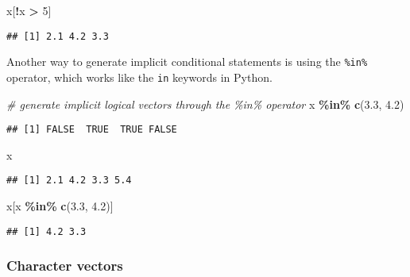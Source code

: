 \documentclass[
]{book}
\newenvironment{Shaded}{\begin{snugshade}}{\end{snugshade}}
\newcommand{\CommentTok}[1]{\textcolor[rgb]{0.56,0.35,0.01}{\textit{#1}}}
\newcommand{\DecValTok}[1]{\textcolor[rgb]{0.00,0.00,0.81}{#1}}
\newcommand{\FloatTok}[1]{\textcolor[rgb]{0.00,0.00,0.81}{#1}}
\newcommand{\KeywordTok}[1]{\textcolor[rgb]{0.13,0.29,0.53}{\textbf{#1}}}
\newcommand{\NormalTok}[1]{#1}
\newcommand{\OperatorTok}[1]{\textcolor[rgb]{0.81,0.36,0.00}{\textbf{#1}}}
\newcommand{\StringTok}[1]{\textcolor[rgb]{0.31,0.60,0.02}{#1}}
\begin{document}
\begin{Shaded}
\begin{Highlighting}[]
\NormalTok{x[}\OperatorTok{!}\NormalTok{x }\OperatorTok{\textgreater{}}\StringTok{ }\DecValTok{5}\NormalTok{]}
\end{Highlighting}
\end{Shaded}

\begin{verbatim}
## [1] 2.1 4.2 3.3
\end{verbatim}

Another way to generate implicit conditional statements is using the \texttt{\%in\%} operator, which works like the \texttt{in} keywords in Python.

\begin{Shaded}
\begin{Highlighting}[]
\CommentTok{\# generate implicit logical vectors through the \%in\% operator}
\NormalTok{x }\OperatorTok{\%in\%}\StringTok{ }\KeywordTok{c}\NormalTok{(}\FloatTok{3.3}\NormalTok{, }\FloatTok{4.2}\NormalTok{)}
\end{Highlighting}
\end{Shaded}

\begin{verbatim}
## [1] FALSE  TRUE  TRUE FALSE
\end{verbatim}

\begin{Shaded}
\begin{Highlighting}[]
\NormalTok{x}
\end{Highlighting}
\end{Shaded}

\begin{verbatim}
## [1] 2.1 4.2 3.3 5.4
\end{verbatim}

\begin{Shaded}
\begin{Highlighting}[]
\NormalTok{x[x }\OperatorTok{\%in\%}\StringTok{ }\KeywordTok{c}\NormalTok{(}\FloatTok{3.3}\NormalTok{, }\FloatTok{4.2}\NormalTok{)]}
\end{Highlighting}
\end{Shaded}

\begin{verbatim}
## [1] 4.2 3.3
\end{verbatim}

\hypertarget{character-vectors}{%
\subsubsection{Character vectors}\label{character-vectors}}
\end{document}
